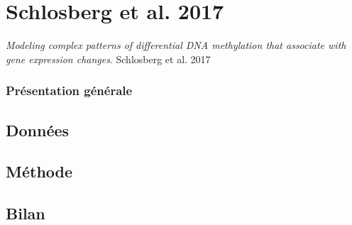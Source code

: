 \documentclass{beamer}
\begin{document}
\section{Schlosberg et al. 2017}

\begin{frame}
\begin{center}
\textit{Modeling complex patterns of differential DNA methylation that associate with gene expression changes}. Schlosberg et al. 2017
\end{center}
\end{frame}

\begin{frame}
\frametitle{Présentation générale}
\end{frame}

\begin{frame}
\end{frame}



\subsection{Données}

\subsection{Méthode}

\subsection{Bilan}
\end{document}
